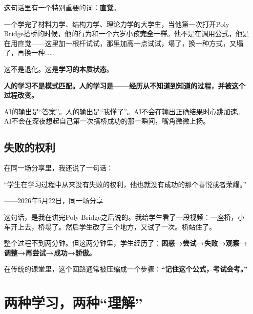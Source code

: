 这句话里有一个特别重要的词：\textbf{直觉}。

一个学完了材料力学、结构力学、理论力学的大学生，当他第一次打开Poly Bridge搭桥的时候，他的行为和一个六岁小孩\textbf{完全一样}。他不是在调用公式，他是在用直觉——这里加一根杆试试，那里加高一点试试，塌了，换一种方式，又塌了，再换一种\ldots\ldots

这不是退化。这是\textbf{学习的本质状态}。

\begin{insight}
\label{insight:chap1-intuition}

\textbf{人的学习不是模式匹配。人的学习是——经历从不知道到知道的过程，并被这个过程改变。}

AI的输出是“答案”。人的输出是“我懂了”。AI不会在输出正确结果时心跳加速。AI不会在深夜想起自己第一次搭桥成功的那一瞬间，嘴角微微上扬。
\end{insight}

\subsection{失败的权利}

在同一场分享里，我还说了一句话：

\begin{shiyu-inline}
“学生在学习过程中从来没有失败的权利，他也就没有成功的那个喜悦或者荣耀。”

\hfill ——2026年5月22日，同一场分享
\end{shiyu-inline}

这句话，是我在讲完Poly Bridge之后说的。我给学生看了一段视频：一座桥，小车开上去，桥塌了。然后学生改了三个地方，又试了一次。桥站住了。

整个过程不到两分钟。但这两分钟里，学生经历了：\textbf{困惑→尝试→失败→观察→调整→再尝试→成功→骄傲。}

在传统的课堂里，这个回路通常被压缩成一个步骤：\textbf{“记住这个公式，考试会考。”}

\section{两种学习，两种“理解”}

